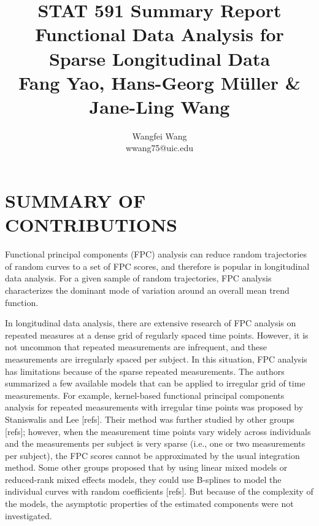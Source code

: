\documentclass[11pt]{report}
\begin{document}
\title{
  \huge STAT 591 Summary Report \\ 
  \vspace{10mm}
  \large  Functional Data Analysis for Sparse Longitudinal Data\\
  \normalsize Fang Yao, Hans-Georg M\"{u}ller \& Jane-Ling Wang}

\author{Wangfei Wang \\ wwang75@uic.edu }

\graphicspath{{./Figures/}}

\maketitle


\section{SUMMARY OF CONTRIBUTIONS}
Functional principal components (FPC) analysis can reduce random trajectories of random curves to a set of FPC scores, and therefore is popular in longitudinal data analysis. 
For a given sample of random trajectories, FPC analysis characterizes the dominant mode of variation  around an overall mean trend function. 

In longitudinal data analysis, there are extensive research of FPC analysis on repeated measures at a dense grid of regularly spaced time points. 
However, it is not uncommon that repeated measurements are infrequent, and these measurements are irregularly spaced per subject. 
In this situation, FPC analysis has limitations because of the sparse repeated measurements. 
The authors summarized a few available models that can be applied to irregular grid of time measurements. 
For example, kernel-based functional principal components analysis for repeated measurements with irregular time points was proposed by Staniswalis and Lee [refs]. %
Their method was further studied by other groups [refs]; %
however, when the measurement time points vary widely across individuals and the measurements per subject is very sparse (i.e., one or two measurements per subject), the FPC scores cannot be approximated by the usual integration method. 
Some other groups proposed that by using linear mixed models or reduced-rank mixed effects models, they could use B-splines to model the individual curves with random coefficients [refs]. %
But because of the complexity of the models, the asymptotic properties of the estimated components were not investigated. 
\end{document}
